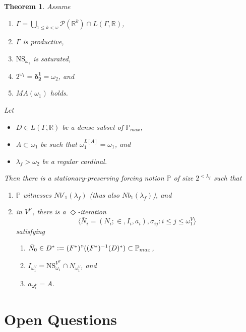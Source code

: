 \documentclass[12pt, twoside]{memoir}
\numberwithin{equation}{section}
\newtheorem{thm}{Theorem}[section]
\theoremstyle{definition}
\theoremstyle{remark}
\theoremstyle{definition}
\theoremstyle{definition}
\theoremstyle{definition}
\theoremstyle{remark}
\begin{document}
\begin{thm}
Assume
\begin{enumerate}[label=(\roman*), leftmargin=40pt]
    \item $\Gamma  = \bigcup_{1 \leq k < \omega} \mathcal{P}(\mathbb{R}^{k}) \cap L(\Gamma, \mathbb{R})$,
    \item $\Gamma$ is productive,
    \item $\mathrm{NS}_{\omega_1}$ is saturated,
    \item $2^{\omega_1} = \mathbf{\delta^1_2} = \omega_2$, and
    \item $MA(\omega_1)$ holds.
\end{enumerate}
Let 
\begin{itemize}
    \item $D \in L(\Gamma, \mathbb{R})$ be a dense subset of $\mathbb{P}_{max}$,
    \item $A \subset \omega_1$ be such that $\omega_1^{L[A]} = \omega_1$, and
    \item $\lambda_f > \omega_2$ be a regular cardinal.
\end{itemize}
Then there is a stationary-preserving forcing notion $\mathbb{P}$ of size $2^{< \lambda_f}$ such that 
\begin{enumerate}[label=(\alph*)]
    \item $\mathbb{P}$ witnesses $Nb'_1(\lambda_f)$ (thus also $Nb_1(\lambda_f)$), and
    \item in $V^{\mathbb{P}}$, there is a $\Diamond$-iteration $$\langle \bar{N}_i = (N_i; \in, I_i, a_i), \sigma_{ij} : i \leq j \leq \omega_1^V \rangle$$ satisfying 
    \begin{enumerate}[label=(\arabic*), leftmargin=40pt]
        \item $\bar{N}_0 \in D^* := (F^*) " ((F^*)^{-1}(D)^*) \subset \mathbb{P}_{max}$,
        \item $I_{\omega_1^V} = \mathrm{NS}_{\omega_1}^{V^{\mathbb{P}}} \cap N_{\omega_1^V}$, and
        \item $a_{\omega_1^V} = A$.
    \end{enumerate}
\end{enumerate}
\end{thm}

\section{Open Questions}
\end{document}
